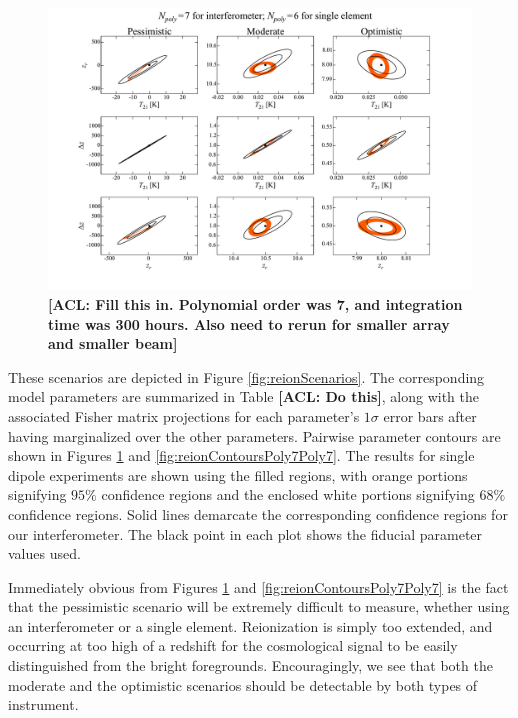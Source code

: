 \documentclass[twolcolumn,apj,iop,numberedappendix]{emulateapj}
\newcommand{\acl}[1]{{\color{red} \textbf{[ACL:  #1]}}}
\begin{document}
\begin{figure}[h]
	\centering
	\includegraphics[width=1.00\textwidth,trim=3cm 2cm 3cm 0cm,clip]{figures/reionContoursPoly7Poly6.pdf}
	\caption{\acl{Fill this in. Polynomial order was 7, and integration time was 300 hours. Also need to rerun for smaller array and smaller beam}}
	\label{fig:reionContoursPoly7Poly6}
\end{figure}

These scenarios are depicted in Figure \ref{fig:reionScenarios}. The corresponding model parameters are summarized in Table \acl{Do this}, along with the associated Fisher matrix projections for each parameter's $1\sigma$ error bars after having marginalized over the other parameters. Pairwise parameter contours are shown in Figures \ref{fig:reionContoursPoly7Poly6} and \ref{fig:reionContoursPoly7Poly7}. The results for single dipole experiments are shown using the filled regions, with orange portions signifying $95\%$ confidence regions and the enclosed white portions signifying $68\%$ confidence regions. Solid lines demarcate the corresponding confidence regions for our interferometer. The black point in each plot shows the fiducial parameter values used.

Immediately obvious from Figures \ref{fig:reionContoursPoly7Poly6} and \ref{fig:reionContoursPoly7Poly7} is the fact that the pessimistic scenario will be extremely difficult to measure, whether using an interferometer or a single element. Reionization is simply too extended, and occurring at too high of a redshift for the cosmological signal to be easily distinguished from the bright foregrounds. Encouragingly, we see that both the moderate and the optimistic scenarios should be detectable by both types of instrument.
\end{document}

